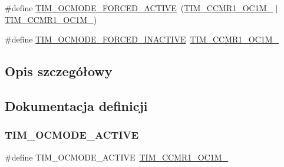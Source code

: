 \begin{DoxyCompactItemize}
\item 
\#define \hyperlink{group___t_i_m___output___compare__and___p_w_m__modes_ga0a78cecaf884a89963e2a8e6af7e6128}{T\+I\+M\+\_\+\+O\+C\+M\+O\+D\+E\+\_\+\+F\+O\+R\+C\+E\+D\+\_\+\+A\+C\+T\+I\+VE}~(\hyperlink{group___peripheral___registers___bits___definition_gac024f6b9972b940925ab5786ee38701b}{T\+I\+M\+\_\+\+C\+C\+M\+R1\+\_\+\+O\+C1\+M\+\_} $\vert$ \hyperlink{group___peripheral___registers___bits___definition_ga410a4752a98081bad8ab3f72b28e7c5f}{T\+I\+M\+\_\+\+C\+C\+M\+R1\+\_\+\+O\+C1\+M\+\_})
\item 
\#define \hyperlink{group___t_i_m___output___compare__and___p_w_m__modes_ga4572f724ce30ce45557f1dc5141afb3e}{T\+I\+M\+\_\+\+O\+C\+M\+O\+D\+E\+\_\+\+F\+O\+R\+C\+E\+D\+\_\+\+I\+N\+A\+C\+T\+I\+VE}~\hyperlink{group___peripheral___registers___bits___definition_gac024f6b9972b940925ab5786ee38701b}{T\+I\+M\+\_\+\+C\+C\+M\+R1\+\_\+\+O\+C1\+M\+\_}
\end{DoxyCompactItemize}


\subsection{Opis szczegółowy}


\subsection{Dokumentacja definicji}
\mbox{\label{group___t_i_m___output___compare__and___p_w_m__modes_ga111d1023e3ac6ef5544775c3863b4b12}} 
\subsubsection{\texorpdfstring{T\+I\+M\+\_\+\+O\+C\+M\+O\+D\+E\+\_\+\+A\+C\+T\+I\+VE}{TIM\_OCMODE\_ACTIVE}}
{\footnotesize\ttfamily \#define T\+I\+M\+\_\+\+O\+C\+M\+O\+D\+E\+\_\+\+A\+C\+T\+I\+VE~\hyperlink{group___peripheral___registers___bits___definition_ga410a4752a98081bad8ab3f72b28e7c5f}{T\+I\+M\+\_\+\+C\+C\+M\+R1\+\_\+\+O\+C1\+M\+\_}}

